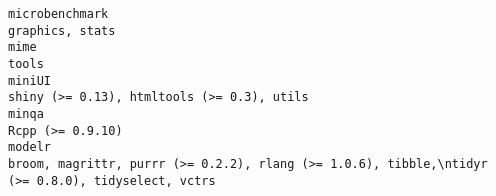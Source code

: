 \documentclass[
  letterpaper,
  DIV=11,
  numbers=noendperiod]{scrreprt}
\begin{document}
\begin{verbatim}
microbenchmark                                                                                                                                                                                                                                                                                                                                                                                                                                                                                                                                                                                             graphics, stats
mime                                                                                                                                                                                                                                                                                                                                                                                                                                                                                                                                                                                                                 tools
miniUI                                                                                                                                                                                                                                                                                                                                                                                                                                                                                                                                                                          shiny (>= 0.13), htmltools (>= 0.3), utils
minqa                                                                                                                                                                                                                                                                                                                                                                                                                                                                                                                                                                                                     Rcpp (>= 0.9.10)
modelr                                                                                                                                                                                                                                                                                                                                                                                                                                                                                                                   broom, magrittr, purrr (>= 0.2.2), rlang (>= 1.0.6), tibble,\ntidyr (>= 0.8.0), tidyselect, vctrs

\end{verbatim}
\end{document}
